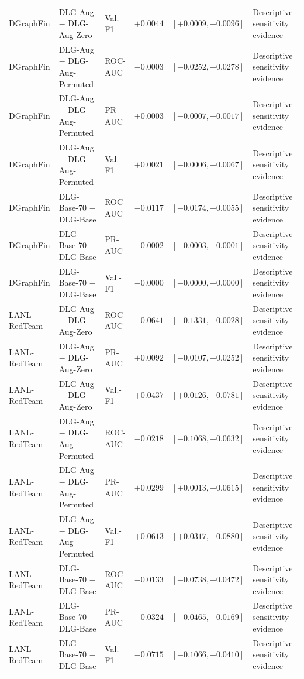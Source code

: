 \begin{table}[t]
\begin{tabular}{@{}l l l r c l@{}}
DGraphFin & DLG-Aug $-$ DLG-Aug-Zero & Val.-F1 & $+0.0044$ & $[+0.0009, +0.0096]$ & Descriptive sensitivity evidence \\
DGraphFin & DLG-Aug $-$ DLG-Aug-Permuted & ROC-AUC & $-0.0003$ & $[-0.0252, +0.0278]$ & Descriptive sensitivity evidence \\
DGraphFin & DLG-Aug $-$ DLG-Aug-Permuted & PR-AUC & $+0.0003$ & $[-0.0007, +0.0017]$ & Descriptive sensitivity evidence \\
DGraphFin & DLG-Aug $-$ DLG-Aug-Permuted & Val.-F1 & $+0.0021$ & $[-0.0006, +0.0067]$ & Descriptive sensitivity evidence \\
DGraphFin & DLG-Base-70 $-$ DLG-Base & ROC-AUC & $-0.0117$ & $[-0.0174, -0.0055]$ & Descriptive sensitivity evidence \\
DGraphFin & DLG-Base-70 $-$ DLG-Base & PR-AUC & $-0.0002$ & $[-0.0003, -0.0001]$ & Descriptive sensitivity evidence \\
DGraphFin & DLG-Base-70 $-$ DLG-Base & Val.-F1 & $-0.0000$ & $[-0.0000, -0.0000]$ & Descriptive sensitivity evidence \\
\midrule
LANL-RedTeam & DLG-Aug $-$ DLG-Aug-Zero & ROC-AUC & $-0.0641$ & $[-0.1331, +0.0028]$ & Descriptive sensitivity evidence \\
LANL-RedTeam & DLG-Aug $-$ DLG-Aug-Zero & PR-AUC & $+0.0092$ & $[-0.0107, +0.0252]$ & Descriptive sensitivity evidence \\
LANL-RedTeam & DLG-Aug $-$ DLG-Aug-Zero & Val.-F1 & $+0.0437$ & $[+0.0126, +0.0781]$ & Descriptive sensitivity evidence \\
LANL-RedTeam & DLG-Aug $-$ DLG-Aug-Permuted & ROC-AUC & $-0.0218$ & $[-0.1068, +0.0632]$ & Descriptive sensitivity evidence \\
LANL-RedTeam & DLG-Aug $-$ DLG-Aug-Permuted & PR-AUC & $+0.0299$ & $[+0.0013, +0.0615]$ & Descriptive sensitivity evidence \\
LANL-RedTeam & DLG-Aug $-$ DLG-Aug-Permuted & Val.-F1 & $+0.0613$ & $[+0.0317, +0.0880]$ & Descriptive sensitivity evidence \\
LANL-RedTeam & DLG-Base-70 $-$ DLG-Base & ROC-AUC & $-0.0133$ & $[-0.0738, +0.0472]$ & Descriptive sensitivity evidence \\
LANL-RedTeam & DLG-Base-70 $-$ DLG-Base & PR-AUC & $-0.0324$ & $[-0.0465, -0.0169]$ & Descriptive sensitivity evidence \\
LANL-RedTeam & DLG-Base-70 $-$ DLG-Base & Val.-F1 & $-0.0715$ & $[-0.1066, -0.0410]$ & Descriptive sensitivity evidence \\
\bottomrule
\end{tabular}
\end{table}
